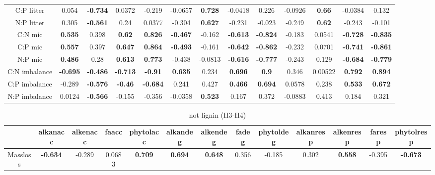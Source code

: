 \documentclass[authoryear,preprint,review,12pt]{elsarticle}
\begin{document}
\begin{landscape}
\begin{table}[h!]
\begin{center}
{\begin{tabular}{ccccccccccccc}
  C:P litter & 0.054 & \textbf{ -0.734 } & 0.0372 & -0.219 & -0.0657 & \textbf{ 0.728 } & -0.0418 & 0.226 & -0.0926 & \textbf{ 0.66 } & -0.0384 & 0.132 \\ 
  N:P litter & 0.305 & \textbf{ -0.561 } & 0.24 & 0.0377 & -0.304 & \textbf{ 0.627 } & -0.231 & -0.023 & -0.249 & \textbf{ 0.62 } & -0.243 & -0.101 \\ 
  C:N mic & \textbf{ 0.535 } & 0.398 & \textbf{ 0.62 } & \textbf{ 0.826 } & \textbf{ -0.467 } & -0.162 & \textbf{ -0.613 } & \textbf{ -0.824 } & -0.183 & 0.0541 & \textbf{ -0.728 } & \textbf{ -0.835 } \\ 
  C:P mic & \textbf{ 0.557 } & 0.397 & \textbf{ 0.647 } & \textbf{ 0.864 } & \textbf{ -0.493 } & -0.161 & \textbf{ -0.642 } & \textbf{ -0.862 } & -0.232 & 0.0701 & \textbf{ -0.741 } & \textbf{ -0.861 } \\ 
  N:P mic & \textbf{ 0.486 } & 0.28 & \textbf{ 0.613 } & \textbf{ 0.773 } & -0.438 & -0.0813 & \textbf{ -0.616 } & \textbf{ -0.777 } & -0.243 & 0.129 & \textbf{ -0.684 } & \textbf{ -0.779 } \\ 
  C:N imbalance & \textbf{ -0.695 } & \textbf{ -0.486 } & \textbf{ -0.713 } & \textbf{ -0.91 } & \textbf{ 0.635 } & 0.234 & \textbf{ 0.696 } & \textbf{  0.9 } & 0.346 & 0.00522 & \textbf{ 0.792 } & \textbf{ 0.894 } \\ 
  C:P imbalance & -0.289 & \textbf{ -0.576 } & \textbf{ -0.46 } & \textbf{ -0.684 } & 0.241 & 0.427 & \textbf{ 0.466 } & \textbf{ 0.694 } & 0.0578 & 0.238 & \textbf{ 0.533 } & \textbf{ 0.672 } \\ 
  N:P imbalance & 0.0124 & \textbf{ -0.566 } & -0.155 & -0.356 & -0.0358 & \textbf{ 0.523 } & 0.167 & 0.372 & -0.0883 & 0.413 & 0.184 & 0.321 \\ 
   \hline
\end{tabular}
}
\end{center}
\end{table}
\newpage
\begin{table}[h!]
\begin{center}
\caption{not lignin (H3-H4)}
\label{corrtable2_notlig}
{\tiny
\begin{tabular}{ccccccccccccc}
  \hline
 & alkanacc & alkenacc & faacc & phytolacc & alkandeg & alkendeg & fadeg & phytoldeg & alkanresp & alkenresp & faresp & phytolresp \\ 
  \hline
Massloss & \textbf{ -0.634 } & -0.289 & 0.0683 & \textbf{ 0.709 } & \textbf{ 0.694 } & \textbf{ 0.648 } & 0.356 & -0.185 & 0.302 & \textbf{ 0.558 } & -0.395 & \textbf{ -0.673 } \\ 

\end{tabular}}
\end{center}
\end{table}
\end{landscape}
\end{document}
